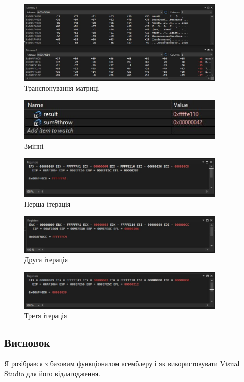 \documentclass[12pt]{extarticle}
\begin{document}
\vspace{12pt}
\begin{figure}[H]
    \centering
    \includegraphics[width=0.90\textwidth]{matrix.png.jpg}
    \caption{Транспонування матриці}
\end{figure}
\begin{figure}[H]
    \centering
    \includegraphics[width=0.90\textwidth]{matrix_vars.jpg}
    \caption{Змінні}
\end{figure}

\begin{figure}[H]
    \centering
    \includegraphics[width=0.90\textwidth]{iter1.jpg}
    \caption{Перша ітерація}
\end{figure}
\begin{figure}[H]
    \centering
    \includegraphics[width=0.90\textwidth]{iter2.jpg}
    \caption{Друга ітерація}
\end{figure}
\begin{figure}[H]
    \centering
    \includegraphics[width=0.90\textwidth]{iter3.jpg}
    \caption{Третя ітерація}
\end{figure}

\vspace{12pt}

\subsection*{Висновок} 
Я розібрався з базовим функціоналом асемблеру і як використовувати
Visual Studio для його відлагодження.
\end{document}
